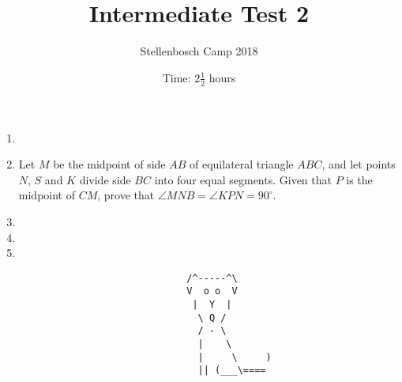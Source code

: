 \documentclass{article}
\title{Intermediate Test 2}
\author{Stellenbosch Camp 2018}
\date{Time: $2\frac{1}{2}$ hours}
\begin{document}
\maketitle

\begin{enumerate}[1.]

\item %

\vspace{12pt}
\item 
Let $M$ be the midpoint of side $AB$ of equilateral triangle $ABC$, and let points $N$, $S$ and $K$ divide side $BC$ into four equal segments. Given that $P$ is the midpoint of $CM$, prove that $\angle MNB = \angle KPN = 90^\circ$.

\vspace{12pt}
\item 

\vspace{12pt}
\item

\vspace{12pt}
\item 

\end{enumerate}


\begin{center}
\begin{verbatim}
                                 /^-----^\
                                 V  o o  V
                                  |  Y  |
                                   \ Q /
                                   / - \
                                   |    \
                                   |     \     )
                                   || (___\====
\end{verbatim}
\end{center}
\end{document}
